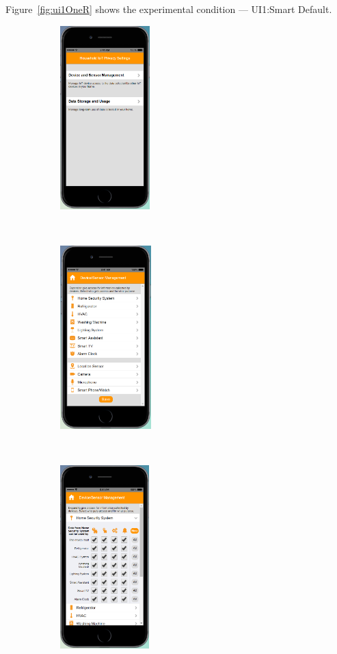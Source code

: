 Figure~\ref{fig:ui1OneR} shows the experimental condition --- UI1:Smart Default.
\begin{figure}
	\centering
	\begin{subfigure}[t]{0.24\textwidth}
		\centering
		\includegraphics[height=2.8in]{figures/ui1sd1.png}
	\end{subfigure}%
	~
	\begin{subfigure}[t]{0.24\textwidth}
		\centering
		\includegraphics[height=2.8in]{figures/ui1sd2.png}
	\end{subfigure}%
	~
	\begin{subfigure}[t]{0.24\textwidth}
		\centering
		\includegraphics[height=2.8in]{figures/ui1sd3.png}

\end{subfigure}
\end{figure}
